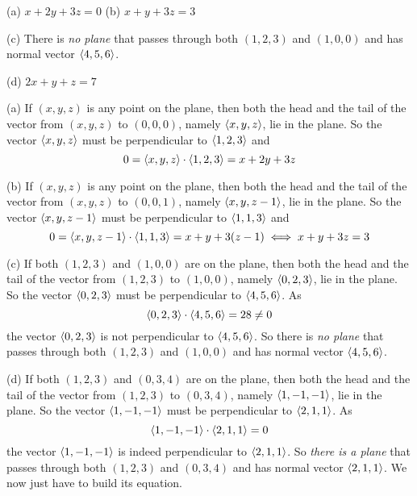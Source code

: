
\begin{answer}
(a) $x+2y+3z=0$ \qquad
(b) $x+y+3z=3$ 

(c) There is \emph{no plane} that passes through both $(1,2,3)$
and $(1,0,0)$ and has normal vector $\left< 4,5,6\right>$.

(d) $2x+y+z=7$
\end{answer}

\begin{solution}
(a) 
If $(x,y,z)$ is any point on the plane, then both the head and the tail of the vector from $(x,y,z)$ to $(0,0,0)$, namely $\left< x,y,z\right>$, lie in the plane. So the vector  $\left< x,y,z\right>$ must be perpendicular to $\left< 1,2,3\right>$ and
\begin{equation*}
0=\left< x,y,z\right>\cdot \left< 1,2,3\right> =x+2y+3z
\end{equation*}

(b) 
If $(x,y,z)$ is any point on the plane, then both the head and the tail of the vector from $(x,y,z)$ to $(0,0,1)$, namely $\left< x,y,z-1\right>$, lie in the plane. So the vector  $\left< x,y,z-1\right>$ must be perpendicular to $\left< 1,1,3\right>$ and
\begin{equation*}
0=\left< x,y,z-1\right>\cdot \left< 1,1,3\right> =x+y+3(z-1)
\iff x+y+3z=3
\end{equation*}

(c)
If both $(1,2,3)$ and $(1,0,0)$ are on the plane, then both the head and the tail of the vector from $(1,2,3)$ to $(1,0,0)$, namely $\left< 0,2,3\right>$, lie in the plane. So the vector $\left< 0,2,3\right>$ must be perpendicular to 
$\left< 4,5,6\right>$. As
\begin{equation*}
\left< 0,2,3\right> \cdot \left< 4,5,6\right> = 28\ne 0
\end{equation*}
the vector  $\left< 0,2,3\right>$ is not perpendicular to $\left< 4,5,6\right>$.
So there is \emph{no plane} that passes through both $(1,2,3)$
and $(1,0,0)$ and has normal vector $\left< 4,5,6\right>$.

(d)
If both $(1,2,3)$ and $(0,3,4)$ are on the plane, then both the head and the tail of the vector from $(1,2,3)$ to $(0,3,4)$, namely $\left< 1,-1,-1\right>$, lie in the plane. So the vector  $\left< 1,-1,-1\right>$ must be perpendicular to 
$\left< 2,1,1\right>$. As
\begin{equation*}
\left< 1,-1,-1\right> \cdot \left< 2,1,1\right> = 0
\end{equation*}
the vector  $\left< 1,-1,-1\right>$ is indeed perpendicular to $\left< 2,1,1\right>$.
So \emph{there is a plane} that passes through both $(1,2,3)$
and $(0,3,4)$ and has normal vector $\left< 2,1,1\right>$. We now just have to build its equation.


\end{solution}
